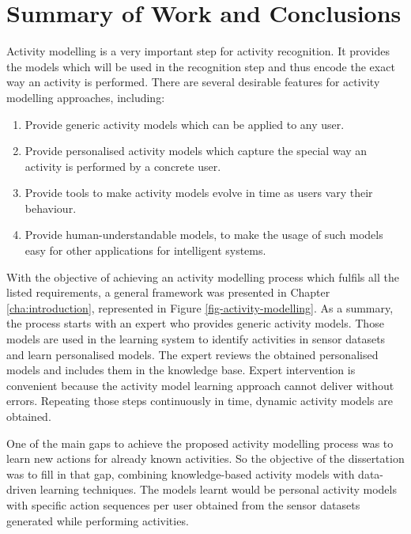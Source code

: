\section{Summary of Work and Conclusions}
\label{sec:conclusions:conclusions}

Activity modelling is a very important step for activity recognition. It provides the models which will be used in the recognition step and thus encode the exact way an activity is performed. There are several desirable features for activity modelling approaches, including:

\begin{enumerate}
 \item Provide generic activity models which can be applied to any user.
 \item Provide personalised activity models which capture the special way an activity is performed by a concrete user.
 \item Provide tools to make activity models evolve in time as users vary their behaviour.
 \item Provide human-understandable models, to make the usage of such models easy for other applications for intelligent systems.
\end{enumerate}

With the objective of achieving an activity modelling process which fulfils all the listed requirements, a general framework was presented in Chapter \ref{cha:introduction}, represented in Figure \ref{fig-activity-modelling}. As a summary, the process starts with an expert who provides generic activity models. Those models are used in the learning system to identify activities in sensor datasets and learn personalised models. The expert reviews the obtained personalised models and includes them in the knowledge base. Expert intervention is convenient because the activity model learning approach cannot deliver without errors. Repeating those steps continuously in time, dynamic activity models are obtained.

One of the main gaps to achieve the proposed activity modelling process was to learn new actions for already known activities. So the objective of the dissertation was to fill in that gap, combining knowledge-based activity models with data-driven learning techniques. The models learnt would be personal activity models with specific action sequences per user obtained from the sensor datasets generated while performing activities.

